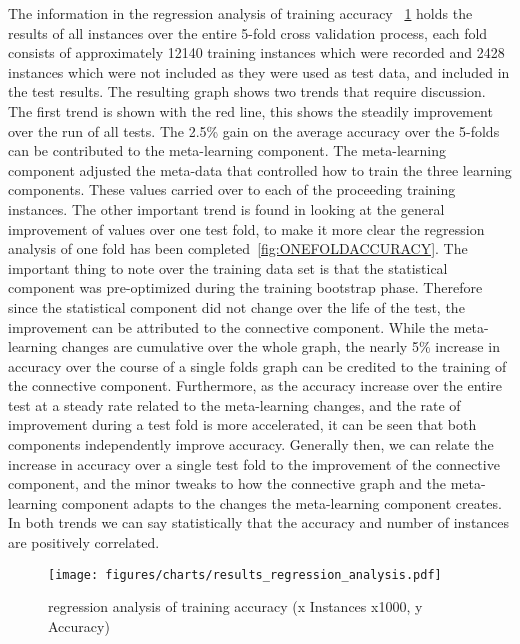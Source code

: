 The information in the regression analysis of training accuracy ~\ref{fig:OVERALLTRAININGACCURACY} holds the results of all instances over the entire 5-fold cross validation process, each fold consists of approximately 12140 training instances which were recorded and 2428 instances which were not included as they were used as test data, and included in the test results. The resulting graph shows two trends that require discussion. The first trend is shown with the red line, this shows the steadily improvement over the run of all tests. The 2.5\% gain on the average accuracy over the 5-folds can be contributed to the meta-learning component.  The meta-learning component adjusted the meta-data that controlled how to train the three learning components.  These values carried over to each of the proceeding training instances.  The other important trend is found in looking at the general improvement of values over one test fold, to make it more clear the regression analysis of one fold has been completed~\ref{fig:ONEFOLDACCURACY}.  The important thing to note over the training data set is that the statistical component was pre-optimized during the training bootstrap phase.  Therefore since the statistical component did not change over the life of the test, the improvement can be attributed to the connective component. While the meta-learning changes are cumulative over the whole graph, the nearly 5\% increase in accuracy over the course of a single folds graph can be credited to the training of the connective component.  Furthermore, as the accuracy increase over the entire test at a steady rate related to the meta-learning changes, and the rate of improvement during a test fold is more accelerated, it can be seen that both components independently improve accuracy.  Generally then, we can relate the increase in accuracy over a single test fold to the improvement of the connective component, and the minor tweaks to how the connective graph and the meta-learning component adapts to the changes the meta-learning component creates.  In both trends we can say statistically that the accuracy and number of instances are positively correlated.

\begin{figure}[htp]
	\begin{center}
		\texttt{[image: figures/charts/results\_regression\_analysis.pdf]}
		\caption{regression analysis of training accuracy (x Instances x1000, y Accuracy)}
	\end{center}
	\label{fig:OVERALLTRAININGACCURACY}
\end{figure}

